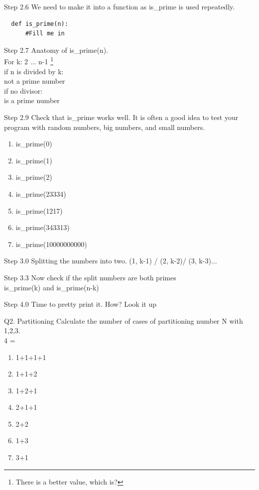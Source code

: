 \documentclass{beamer}
\begin{document}
\begin{frame}[fragile]{Step 2.6}
  We need to make it into a function as is\_prime is used repeatedly.
  \begin{lstlisting}
  def is_prime(n):
      #Fill me in
  \end{lstlisting}
\end{frame}

\begin{frame}[fragile]{Step 2.7}
  Anatomy of is\_prime(n).\\
  For k: 2 ... n-1 \footnote{There is a better value, which is?}\\
    if n is divided by k:\\
        not a prime number\\
  if no divisor:\\
    is a prime number
\end{frame}

\begin{frame}[fragile]{Step 2.9}
  Check that is\_prime works well.
  It is often a good idea to test your program with
  random numbers, big numbers, and small numbers.
  \begin{enumerate}
    \item is\_prime(0)
    \item is\_prime(1)
    \item is\_prime(2)
    \item is\_prime(23334)
    \item is\_prime(1217)
    \item is\_prime(343313)
    \item is\_prime(10000000000)
  \end{enumerate}
\end{frame}

\begin{frame}[fragile]{Step 3.0}
  Splitting the numbers into two.
  (1, k-1) / (2, k-2)/ (3, k-3)...
\end{frame}

\begin{frame}[fragile]{Step 3.3}
  Now check if the split numbers are both primes\\
  is\_prime(k) and is\_prime(n-k)
\end{frame}

\begin{frame}[fragile]{Step 4.0}
  Time to pretty print it.
  How? Look it up
\end{frame}

\begin{frame}{Q2. Partitioning}
  Calculate the number of cases of partitioning number N with 1,2,3.\\
  4 =
  \begin{enumerate}
    \item 1+1+1+1
    \item 1+1+2
    \item 1+2+1
    \item 2+1+1
    \item 2+2
    \item 1+3
    \item 3+1
  \end{enumerate}
\end{frame}
\end{document}
